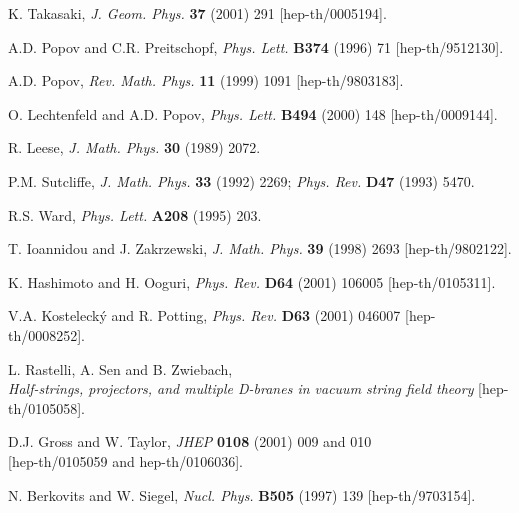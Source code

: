 \documentclass[a4paper,11pt]{article}
\numberwithin{equation}{section}
\begin{document}
\begin{thebibliography}{99}
K. Takasaki,
{\sl J. Geom. Phys.} {\bf 37} (2001) 291 [hep-th/0005194].

A.D. Popov and C.R. Preitschopf,
{\sl Phys. Lett.} {\bf B374} (1996) 71 [hep-th/9512130].

A.D. Popov,
{\sl Rev. Math. Phys.} {\bf 11} (1999) 1091 [hep-th/9803183].

O. Lechtenfeld and A.D. Popov,
{\sl Phys. Lett.} {\bf B494} (2000) 148 [hep-th/0009144].

R. Leese,
{\sl J. Math. Phys.} {\bf 30} (1989) 2072.

P.M. Sutcliffe,
{\sl J. Math. Phys.} {\bf 33}  (1992) 2269;
{\sl Phys. Rev.} {\bf  D47} (1993) 5470.

R.S. Ward,
{\sl Phys. Lett.} {\bf A208} (1995) 203.

T. Ioannidou and J. Zakrzewski,
{\sl J. Math. Phys.} {\bf 39} (1998) 2693 [hep-th/9802122].

K. Hashimoto and H. Ooguri,
{\sl Phys. Rev.} {\bf D64} (2001) 106005 
[hep-th/0105311].

V.A. Kosteleck\'y and R. Potting,
{\sl Phys. Rev.} {\bf D63} (2001) 046007 [hep-th/0008252].

L. Rastelli, A. Sen and B. Zwiebach,\\
{\it Half-strings, projectors, and multiple D-branes in vacuum
     string field theory} [hep-th/0105058].

D.J. Gross and W. Taylor,
{\sl JHEP} {\bf 0108} (2001) 009 and 010\\
{}[hep-th/0105059 and hep-th/0106036].

N. Berkovits and W. Siegel,
{\sl Nucl. Phys.} {\bf B505} (1997) 139 [hep-th/9703154].


\end{thebibliography}
\end{document}
